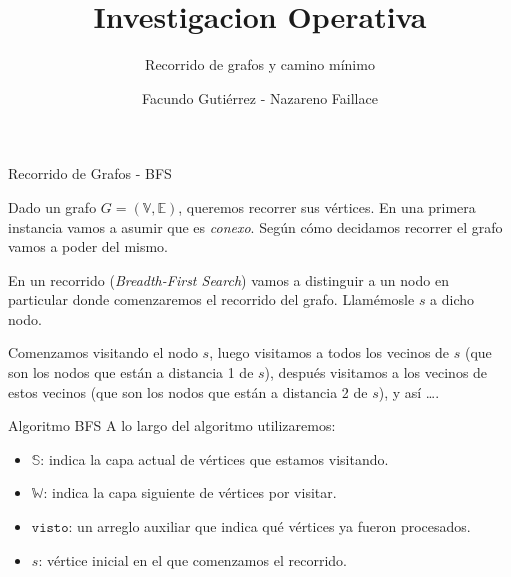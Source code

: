 \documentclass[10pt,hyperref={colorlinks = true,linkcolor = blue}, aspectratio=169]{beamer}
\title{Investigacion Operativa}
\subtitle{Recorrido de grafos y camino mínimo}
\date{}
\author{Facundo Gutiérrez - Nazareno Faillace}
\institute{Departamento de Matemática, FCEN, UBA}
\newcommand \anchoPagina{1.0} %
\begin{document}
\maketitle

\begin{frame}{Recorrido de Grafos - BFS}
    \begin{minipage}{\anchoPagina \textwidth}
        Dado un grafo $G = (\mathbb{V},\mathbb{E})$, queremos recorrer sus vértices. En una primera
        instancia vamos a asumir que es \textit{conexo}. Según cómo decidamos recorrer el grafo vamos a poder
         del mismo.
        \pause
        \vspace{0.3cm}

        En un recorrido  (\textit{Breadth-First Search})
        vamos a distinguir a un nodo en particular donde comenzaremos el
        recorrido del grafo. Llamémosle $s$ a dicho nodo.

        \vspace{0.3cm}
        \pause
        Comenzamos visitando el nodo $s$, luego visitamos a todos los vecinos de $s$ (que son los nodos que están
        a distancia 1 de $s$), después visitamos a los vecinos de estos vecinos (que son los nodos que están
        a distancia 2 de $s$), y así \dots.
    \end{minipage}
\end{frame}

\begin{frame}{Algoritmo BFS}
    A lo largo del algoritmo utilizaremos:
    \pause
    \begin{itemize}
        \item $\mathbb{S}$: indica la capa actual de vértices que estamos visitando.
        \item $\mathbb{W}$: indica la capa siguiente de vértices por visitar.
        \item $\texttt{visto}$: un arreglo auxiliar que indica qué vértices ya fueron procesados.
        \item $s$: vértice inicial en el que comenzamos el recorrido.
    \end{itemize}
\end{frame}
\end{document}
